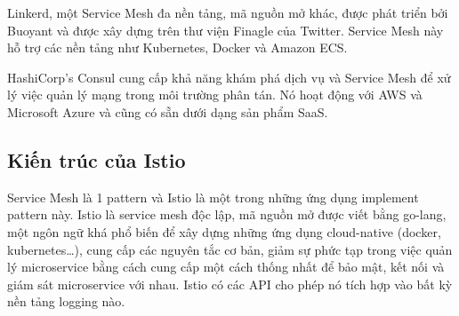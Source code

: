 \documentclass[12pt,a4paper]{report}
\begin{document}
		Linkerd, một Service Mesh đa nền tảng, mã nguồn mở khác, được phát triển bởi Buoyant và được xây dựng trên thư viện Finagle của Twitter. Service Mesh này hỗ trợ các nền tảng như Kubernetes, Docker và Amazon ECS.
		
		HashiCorp’s Consul cung cấp khả năng khám phá dịch vụ và Service Mesh để xử lý việc quản lý mạng trong môi trường phân tán. Nó hoạt động với AWS và Microsoft Azure và cũng có sẵn dưới dạng sản phẩm SaaS.
		\subsection{Kiến trúc của Istio}
		\hspace{0.6cm}Service Mesh là 1 pattern và Istio là một trong những ứng dụng implement pattern này. Istio là service mesh độc lập, mã nguồn mở được viết bằng go-lang, một ngôn ngữ khá phổ biến để xây dựng những ứng dụng cloud-native (docker, kubernetes…), cung cấp các nguyên tắc cơ bản, giảm sự phức tạp trong việc quản lý microservice bằng cách cung cấp một cách thống nhất để bảo mật, kết nối và giám sát microservice với nhau. Istio có các API cho phép nó tích hợp vào bất kỳ nền tảng logging nào.
		
\end{document}
